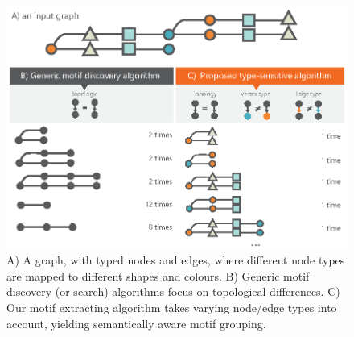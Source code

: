 \begin{table}[!t]
\centering
{}
\caption{Some commonly used motif finding algorithms, and their sampling method.}
\label{tab:motif-algorithms}
\end{table}

\begin{figure}[t!]
\centering
\includegraphics[width=.8\textwidth]{images/automacron/algorithm-differences.eps}
\caption{A) A graph, with typed nodes and edges, where different node types are mapped to different shapes and colours.
B) Generic motif discovery (or search) algorithms focus on topological differences.
C) Our motif extracting algorithm takes varying node/edge types into account, yielding semantically aware motif grouping.
}
\label{fig:new-algorithm-considerations}
\end{figure}

